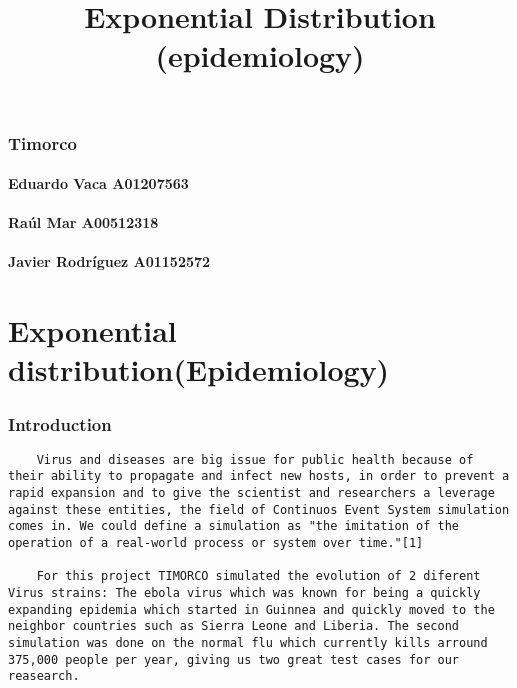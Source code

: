 \documentclass[11pt]{article}
\title{Exponential Distribution (epidemiology)}
\begin{document}
    
    
    \maketitle
    
    

    
    \subsubsection{Timorco}\label{timorco}

\paragraph{Eduardo Vaca A01207563}\label{eduardo-vaca-a01207563}

\paragraph{Raúl Mar A00512318}\label{rauxfal-mar-a00512318}

\paragraph{Javier Rodríguez
A01152572}\label{javier-rodruxedguez-a01152572}

\section{Exponential
distribution(Epidemiology)}\label{exponential-distributionepidemiology}

    \subsubsection{Introduction}\label{introduction}

\begin{verbatim}
    Virus and diseases are big issue for public health because of their ability to propagate and infect new hosts, in order to prevent a rapid expansion and to give the scientist and researchers a leverage against these entities, the field of Continuos Event System simulation comes in. We could define a simulation as "the imitation of the operation of a real-world process or system over time."[1]

    For this project TIMORCO simulated the evolution of 2 diferent Virus strains: The ebola virus which was known for being a quickly expanding epidemia which started in Guinnea and quickly moved to the neighbor countries such as Sierra Leone and Liberia. The second simulation was done on the normal flu which currently kills arround
375,000 people per year, giving us two great test cases for our reasearch.
\end{verbatim}
\end{document}
